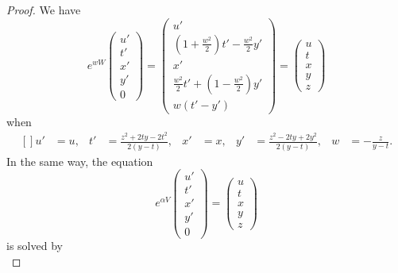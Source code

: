 	\begin{proof}
		We have
		\begin{equation}
			e^{wW}
			\begin{pmatrix}
				u' \\
				t' \\
				x' \\
				y' \\
				0
			\end{pmatrix}=
			\begin{pmatrix}
				u'                                                   \\
				\left( 1+\frac{ w^2 }{2} \right)t'-\frac{ w^2 }{2}y' \\
				x'                                                   \\
				\frac{ w^2 }{2}t'+\left( 1-\frac{ w^2 }{2} \right)y' \\
				w(t'-y')
			\end{pmatrix}
			=
			\begin{pmatrix}
				u \\
				t \\
				x \\
				y \\
				z
			\end{pmatrix}
		\end{equation}
		when
		\begin{equation}
			\begin{aligned}[]
				u' & =u, & t' & =\frac{ z^2+2ty-2t^2 }{ 2(y-t) }, & x' & =x, & y' & =\frac{ z^2-2ty+2y^2 }{ 2(y-t) }, & w & =-\frac{ z }{ y-t }.
			\end{aligned}
		\end{equation}
		In the same way, the equation
		\begin{equation}
			e^{\alpha V}\begin{pmatrix}
				u' \\
				t' \\
				x' \\
				y' \\
				0
			\end{pmatrix}=
			\begin{pmatrix}
				u \\
				t \\
				x \\
				y \\
				z
			\end{pmatrix}
		\end{equation}
		is solved by
		\begin{equation}

\end{equation}
\end{proof}
